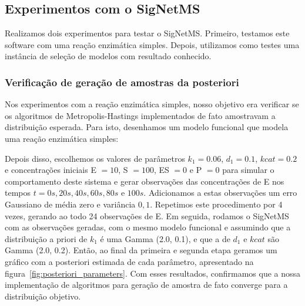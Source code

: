 \documentclass[12pt]{article}
\begin{document}
\subsection{Experimentos com o SigNetMS}\label{experimentos}
Realizamos dois experimentos para testar o SigNetMS. Primeiro, testamos
este software com uma reação enzimática simples. Depois, utilizamos como
testes uma instância de seleção de modelos com resultado conhecido.

\subsubsection{Verificação de geração de amostras da posteriori}
Nos experimentos com a reação enzimática simples, nosso objetivo era
verificar se os algoritmos de Metropolis-Hastings implementados de fato
amostravam a distribuição esperada. Para isto, desenhamos um modelo 
funcional que modela uma reação enzimática simples:
\begin{center}
\end{center}
Depois disso, escolhemos os valores de parâmetros $k_1 = 0.06$, 
$d_1 = 0.1$, $kcat = 0.2$ e concentrações iniciais E $= 10$, S $= 100$, 
ES $= 0$ e P $= 0$ para simular o comportamento deste sistema e gerar 
observações das concentrações de E nos tempos $t = 0s, 20s, 40s, 60s, 
80s$ e $100s$. Adicionamos a estas observações um erro Gaussiano de 
média zero e variância $0,1$. Repetimos este procedimento por 4 vezes, 
gerando ao todo 24 observações de E. Em seguida, rodamos o SigNetMS
com as observações geradas, com o mesmo modelo funcional e assumindo
que a distribuição a priori de $k_1$ é uma Gamma (2.0, 0.1), e que a de 
$d_1$ e $kcat$ são Gamma (2.0, 0.2). Então, ao final da primeira e 
segunda etapa geramos um gráfico com a posteriori estimada de cada 
parâmetro, apresentado na figura~\ref{fig:posteriori_parameters}. Com 
esses resultados, confirmamos que a nossa implementação de algoritmos 
para geração de amostra de fato converge para a distribuição objetivo.
\end{document}
